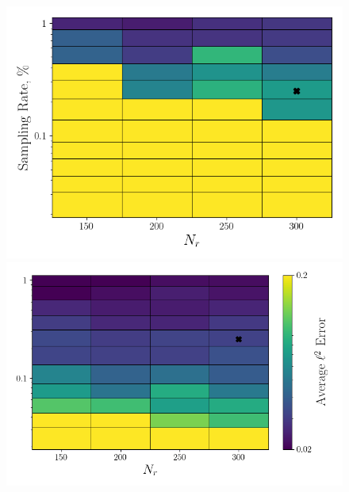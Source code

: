 \begin{figure}
	\begin{minipage}{0.46\linewidth}
		\includegraphics[width=0.99\linewidth]{Chapters/HPROMResults/Images/cvrc/dof_samp/err_contour_random_dof_dt5e-7.png}
	\end{minipage}
	\begin{minipage}{0.53\linewidth}
		\includegraphics[width=0.99\linewidth]{Chapters/HPROMResults/Images/cvrc/dof_samp/err_contour_eigenvec_dof_dt5e-7.png}
	\end{minipage}


\end{figure}
